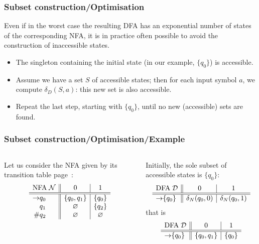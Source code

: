 % 
\begin{frame}
\frametitle{Subset construction/Optimisation}

Even if in the worst case the resulting DFA has an exponential number
of states of the corresponding NFA, it is in practice often possible
to avoid the construction of inaccessible states.
\begin{itemize}

  \item The singleton containing the initial state (in our example,
  \(\{q_0\}\)) is accessible.

  \item Assume we have a set \(S\) of accessible states; then for
  each input symbol \(a\), we compute \(\delta_D(S,a)\): this new set
  is also accessible.

  \item Repeat the last step, starting with \(\{q_0\}\), until no
  new (accessible) sets are found.

\end{itemize}

\end{frame}

% 
\begin{frame}
\frametitle{Subset construction/Optimisation/Example}

\begin{columns}

   Let us consider the NFA given by its
  transition table page~\pageref{nfa_01_suffix_table}:
  \[
  \begin{array}{r@{}l||c|c}
    \multicolumn{2}{c||}{\text{NFA} \; {\cal N}} & 0 & 1\\
    \hline\hline
    \rightarrow & q_0 & \{q_0, q_1\} & \{q_0\}\\
                & q_1 & \varnothing  & \{q_2\}\\
    \#          & q_2 & \varnothing  & \varnothing
  \end{array}
  \]

   Initially, the sole subset of accessible
  states is \(\{q_0\}\):
  \[
  \begin{array}{r@{}l||c|c}
    \multicolumn{2}{c||}{\text{DFA} \; {\cal D}} & 0 & 1\\
    \hline\hline
    \rightarrow & \{q_0\} & \delta_N(q_0,0) & \delta_N(q_0,1)
  \end{array}
  \]
  that is
  \[
  \begin{array}{r@{}l||c|c}
    \multicolumn{2}{c||}{\text{DFA} \; {\cal D}} & 0 & 1\\
    \hline\hline
    \rightarrow & \{q_0\} & \{q_0,q_1\} & \{q_0\}
  \end{array}
  \]

\end{columns}

\end{frame}

